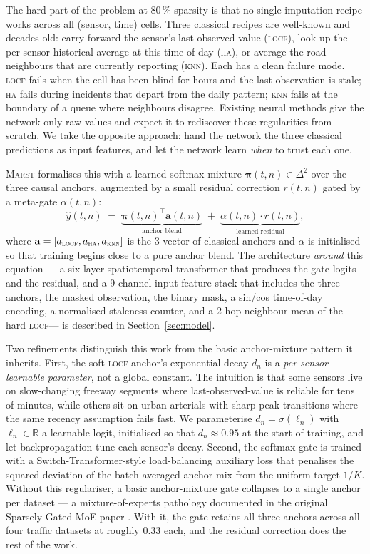 \documentclass[11pt]{article}
\newcommand{\MARST}{\textsc{Marst}\xspace}
\newcommand{\Real}{\mathbb{R}}
\newcommand{\anchorvec}{\mathbf{a}}
\newcommand{\gatevec}{\bm{\pi}}
\newcommand{\LOCF}{\textsc{locf}\xspace}
\newcommand{\HA}{\textsc{ha}\xspace}
\newcommand{\KNN}{\textsc{knn}\xspace}
\begin{document}
The hard part of the problem at 80\,\% sparsity is that no single
imputation recipe works across all (sensor, time) cells.  Three
classical recipes are well-known and decades old: carry forward the
sensor's last observed value (\LOCF), look up the per-sensor historical
average at this time of day (\HA), or average the road neighbours that
are currently reporting (\KNN).  Each has a clean failure mode.  \LOCF
fails when the cell has been blind for hours and the last observation
is stale; \HA fails during incidents that depart from the daily
pattern; \KNN fails at the boundary of a queue where neighbours
disagree.  Existing neural methods give the network only raw values and
expect it to rediscover these regularities from scratch.  We take the
opposite approach: hand the network the three classical predictions as
input features, and let the network learn \emph{when} to trust each
one.

\MARST formalises this with a learned softmax mixture
$\gatevec(t, n) \in \Delta^{2}$ over the three causal anchors,
augmented by a small residual correction $r(t, n)$ gated by a meta-gate
$\alpha(t, n)$:
\begin{equation}
\hat{y}(t, n) \;=\;
\underbrace{\gatevec(t, n)^{\top} \anchorvec(t, n)}_{\text{anchor blend}}
\;+\;
\underbrace{\alpha(t, n) \cdot r(t, n)}_{\text{learned residual}},
\label{eq:marst-prediction}
\end{equation}
where $\anchorvec = [a_{\LOCF}, a_{\HA}, a_{\KNN}]$ is the
3-vector of classical anchors and $\alpha$ is initialised so that
training begins close to a pure anchor blend.  The architecture
\emph{around} this equation --- a six-layer spatiotemporal transformer
that produces the gate logits and the residual, and a 9-channel input
feature stack that includes the three anchors, the masked observation,
the binary mask, a sin/cos time-of-day encoding, a normalised staleness
counter, and a 2-hop neighbour-mean of the hard \LOCF --- is described
in Section~\ref{sec:model}.

Two refinements distinguish this work from the basic anchor-mixture
pattern it inherits.  First, the soft-\LOCF anchor's exponential
decay $d_n$ is a \emph{per-sensor learnable parameter}, not a global
constant.  The intuition is that some sensors live on slow-changing
freeway segments where last-observed-value is reliable for tens of
minutes, while others sit on urban arterials with sharp peak
transitions where the same recency assumption fails fast.  We
parameterise $d_n = \sigma(\ell_n)$ with $\ell_n \in \Real$ a learnable
logit, initialised so that $d_n \approx 0.95$ at the start of training,
and let backpropagation tune each sensor's decay.  Second, the softmax
gate is trained with a Switch-Transformer-style load-balancing
auxiliary loss \citep{fedus2021switch} that penalises the squared
deviation of the batch-averaged anchor mix from the uniform target
$1/K$.  Without this regulariser, a basic anchor-mixture gate collapses
to a single anchor per dataset --- a mixture-of-experts pathology
documented in the original Sparsely-Gated MoE paper
\citep{shazeer2017moe}.  With it, the gate retains all three anchors
across all four traffic datasets at roughly 0.33 each, and the residual
correction does the rest of the work.
\end{document}
